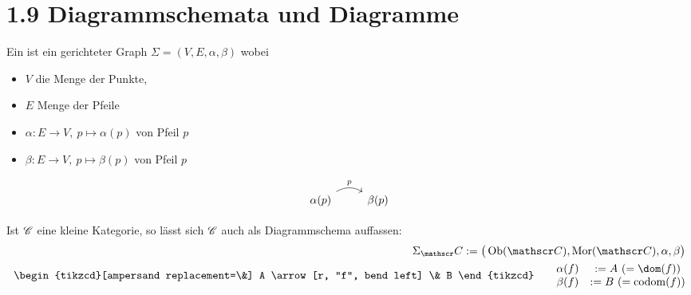 \section{1.9 Diagrammschemata und Diagramme}
\begin{definition}
	Ein  ist ein gerichteter Graph $\Sigma=(V,E,\alpha,\beta)$ wobei 
	\begin{itemize}
		\item $V$ die Menge der Punkte,
		\item $E$ Menge der Pfeile
		\item $\alpha:E\to V,~p\mapsto\alpha(p)$  von Pfeil $p$
		\item $\beta:E\to V,~p\mapsto\beta(p)$  von Pfeil $p$
	\end{itemize}
	$$
	\begin{tikzcd}
\alpha(p) \arrow[r, "p", bend left] & \beta(p)
\end{tikzcd}
$$
\end{definition}

Ist $\mathscr C$ eine kleine Kategorie, so lässt sich $\mathscr C$ auch als Diagrammschema auffassen:
\begin{align*}
	\Sigma_\Cat:=\big(\Ob(\Cat),\Mor(\Cat),\alpha,\beta\big)\\
		\begin{tikzcd}[ampersand replacement=\&]
A \arrow[r, "f", bend left] \& B
\end{tikzcd}\qquad\begin{matrix}
	\alpha(f)& :=A~(=\dom(f))\\
	\beta(f)&:=B~(=\codom(f))
\end{matrix}
\end{align*}

